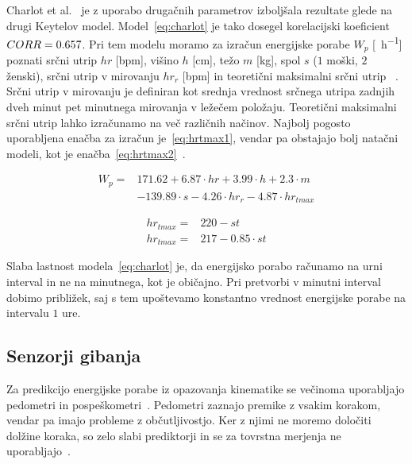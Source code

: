 Charlot et al.~\cite{charlot2014improvement} je z uporabo drugačnih parametrov izboljšala rezultate glede na drugi Keytelov model. Model~\eqref{eq:charlot} je tako dosegel korelacijski koeficient ${CORR}= 0.657$. Pri tem modelu moramo za izračun energijske porabe $W_p$ [\si{\kcal\per\hour}]  poznati srčni utrip $hr$ [\si{bpm}], višino $h$ [\si{\cm}], težo $m$ [\si{\kg}], spol $s$ ($1$ moški, $2$ ženski), srčni utrip v mirovanju $hr_r$ [\si{bpm}] in teoretični maksimalni srčni utrip \hrtmax [\si{bpm}]~\cite{charlot2014improvement}. Srčni utrip v mirovanju je definiran kot srednja vrednost srčnega utripa zadnjih dveh minut pet minutnega mirovanja v ležečem položaju. Teoretični maksimalni srčni utrip lahko izračunamo na več različnih načinov. Najbolj pogosto uporabljena enačba za izračun je~\eqref{eq:hrtmax1}, vendar pa obstajajo bolj natačni modeli, kot je enačba~\eqref{eq:hrtmax2}~\cite{miller1993predicting}. 

\begin{align}\label{eq:charlot}
W_p = & 171.62 + 6.87 \cdot hr + 3.99 \cdot h + 2.3 \cdot m \nonumber \\
& - 139.89 \cdot s - 4.26 \cdot hr_r - 4.87 \cdot hr_{tmax}
\end{align}

\begin{align}
	hr_{tmax} = & 220 - st \label{eq:hrtmax1}\\ 
    hr_{tmax} = & 217 - 0.85 \cdot st \label{eq:hrtmax2}
\end{align}

Slaba lastnost modela~\eqref{eq:charlot} je, da energijsko porabo računamo na urni interval in ne na minutnega, kot je običajno. Pri pretvorbi v minutni interval dobimo približek, saj s tem upoštevamo konstantno vrednost energijske porabe na intervalu $1$ ure. 





\subsection{Senzorji gibanja}\label{sec:senzorji-gibanja}

Za predikcijo energijske porabe iz opazovanja kinematike se večinoma uporabljajo pedometri in pospeškometri~\cite{levine2005measurement}. Pedometri zaznajo premike z vsakim korakom, vendar pa imajo probleme z občutljivostjo. Ker z njimi ne moremo določiti dolžine koraka, so zelo slabi prediktorji in se za tovrstna merjenja ne uporabljajo~\cite{levine2005measurement}.

